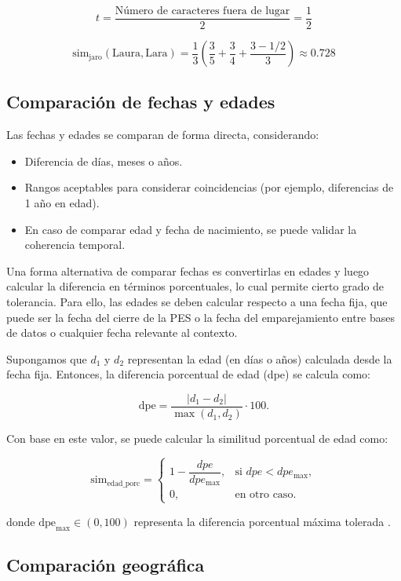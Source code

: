 \documentclass[
  12pt,
]{book}
\providecommand{\tightlist}{%
  \setlength{\itemsep}{0pt}\setlength{\parskip}{0pt}}
\begin{document}
\[t = \frac{\text{Número de caracteres fuera de lugar}}{2} = \frac{1}{2}\]

\[\text{sim}_{\text{jaro}}(\text{Laura}, \text{Lara}) = \frac{1}{3}\left( \frac{3}{5} + \frac{3}{4} + \frac{3 - 1/2}{3}\right) \approx 0.728\]

\subsection{Comparación de fechas y edades}\label{comparaciuxf3n-de-fechas-y-edades}

Las fechas y edades se comparan de forma directa, considerando:

\begin{itemize}
\tightlist
\item
  Diferencia de días, meses o años.
\item
  Rangos aceptables para considerar coincidencias (por ejemplo, diferencias de 1 año en edad).
\item
  En caso de comparar edad y fecha de nacimiento, se puede validar la coherencia temporal.
\end{itemize}

Una forma alternativa de comparar fechas es convertirlas en edades y luego calcular la diferencia en términos porcentuales, lo cual permite cierto grado de tolerancia. Para ello, las edades se deben calcular respecto a una fecha fija, que puede ser la fecha del cierre de la PES o la fecha del emparejamiento entre bases de datos o cualquier fecha relevante al contexto.

Supongamos que \(d_1\) y \(d_2\) representan la edad (en días o años) calculada desde la fecha fija. Entonces, la diferencia porcentual de edad (dpe) se calcula como:

\[\text{dpe} = \frac{|d_1 - d_2|}{\max(d_1, d_2)} \cdot 100.\]

Con base en este valor, se puede calcular la similitud porcentual de edad como:

\[
\mathrm{sim}_{\text{edad\_porc}} =
\begin{cases}
	1 - \dfrac{dpe}{dpe_{\max}}, & \text{si } dpe < dpe_{\max}, \\
	0, & \text{en otro caso}.
\end{cases}
\]


donde \(\text{dpe}_{\max} \in (0, 100)\) representa la diferencia porcentual máxima tolerada \citep{christen2012data}.

\subsection{Comparación geográfica}\label{comparaciuxf3n-geogruxe1fica}
\end{document}
